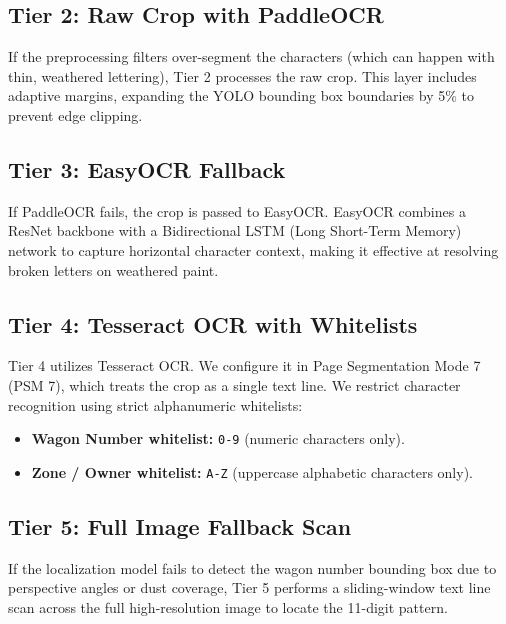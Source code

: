 \documentclass[conference]{IEEEtran}
\begin{document}
\subsection{Tier 2: Raw Crop with PaddleOCR}
If the preprocessing filters over-segment the characters (which can happen with thin, weathered lettering), Tier 2 processes the raw crop. This layer includes adaptive margins, expanding the YOLO bounding box boundaries by 5\% to prevent edge clipping.

\subsection{Tier 3: EasyOCR Fallback}
If PaddleOCR fails, the crop is passed to EasyOCR. EasyOCR combines a ResNet backbone with a Bidirectional LSTM (Long Short-Term Memory) network to capture horizontal character context, making it effective at resolving broken letters on weathered paint.

\subsection{Tier 4: Tesseract OCR with Whitelists}
Tier 4 utilizes Tesseract OCR. We configure it in Page Segmentation Mode 7 (PSM 7), which treats the crop as a single text line. We restrict character recognition using strict alphanumeric whitelists:
\begin{itemize}
    \item \textbf{Wagon Number whitelist:} \texttt{0-9} (numeric characters only).
    \item \textbf{Zone / Owner whitelist:} \texttt{A-Z} (uppercase alphabetic characters only).
\end{itemize}

\subsection{Tier 5: Full Image Fallback Scan}
If the localization model fails to detect the wagon number bounding box due to perspective angles or dust coverage, Tier 5 performs a sliding-window text line scan across the full high-resolution image to locate the 11-digit pattern.
\end{document}
